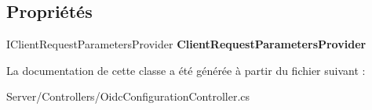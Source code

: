 \subsection*{Propriétés}
\begin{DoxyCompactItemize}
\item 
\mbox{\label{class_mediwatch_website_1_1_server_1_1_controllers_1_1_oidc_configuration_controller_adbbef92a4c8f63721c4ee3018103d3db}} 
I\+Client\+Request\+Parameters\+Provider {\bfseries Client\+Request\+Parameters\+Provider}
\end{DoxyCompactItemize}


La documentation de cette classe a été générée à partir du fichier suivant \+:\begin{DoxyCompactItemize}
\item 
Server/\+Controllers/Oidc\+Configuration\+Controller.\+cs\end{DoxyCompactItemize}
